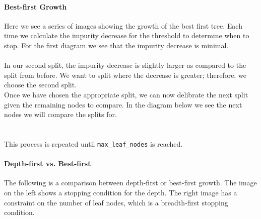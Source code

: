 \documentclass[10pt,a4paper]{report}
\begin{document}
\paragraph{Best-first Growth}Here we see a series of images showing the growth of the best first tree. Each time we calculate the impurity decrease for the threshold to determine when to stop. For the first diagram we see that the impurity decrease is minimal.\\
\\
In our second split, the impurity decrease is slightly larger as compared to the split from before. We want to split where the decrease is greater; therefore, we choose the second split.\\
Once we have chosen the appropriate split, we can now delibrate the next split given the remaining nodes to compare. In the diagram below we see the next nodes we will compare the splits for.\\
\\\\
This process is repeated until \texttt{max\_leaf\_nodes} is reached.
	\paragraph{Depth-first vs. Best-first}The following is a comparison between depth-first or best-first growth. The image on the left shows a stopping condition for the depth. The right image has a constraint on the number of leaf nodes, which is a breadth-first stopping condition.\\
\end{document}
